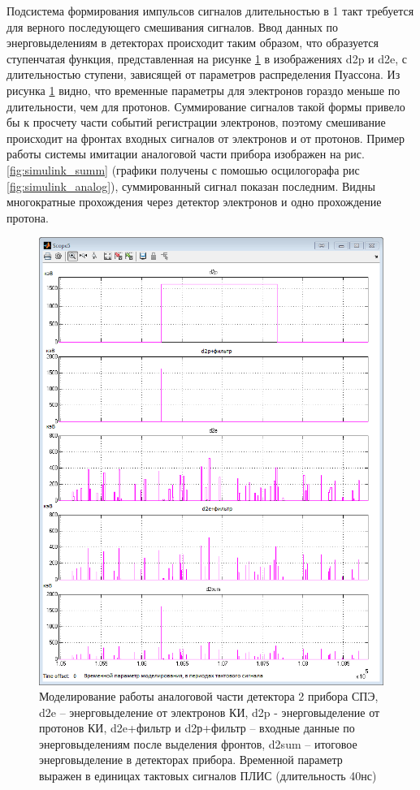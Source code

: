 Подсистема формирования импульсов сигналов длительностью в 1 такт требуется для верного последующего смешивания сигналов. Ввод данных по энерговыделениям в детекторах происходит таким образом, что образуется ступенчатая функция, представленная на рисунке \ref{fig:simulink_analog_scope} в изображениях d2p и d2e, с длительностью ступени, зависящей от параметров распределения Пуассона. Из рисунка \ref{fig:simulink_analog_scope} видно, что временные параметры для электронов гораздо меньше по длительности, чем для протонов. Суммирование сигналов такой формы привело бы к просчету части событий регистрации электронов, поэтому смешивание происходит на фронтах входных сигналов от электронов и от протонов.
Пример работы системы имитации аналоговой части прибора изображен на рис. \ref{fig:simulink_summ} (графики получены с помошью осцилогорафа рис \ref{fig:simulink_analog}), суммированный сигнал показан последним. Видны многократные прохождения через детектор электронов и одно прохождение протона. 
\begin{figure}
\centering
\includegraphics[width=0.7\linewidth]{images/simulink_analog_scope}
\caption[Моделирование работы аналоговой части прибора СПЭ]{Моделирование работы аналоговой части детектора 2 прибора СПЭ, d2e – энерговыделение от электронов КИ, d2p - энерговыделение от протонов КИ, d2e+фильтр и d2р+фильтр – входные данные по энерговыделениям после выделения фронтов,  d2sum – итоговое энерговыделение в детекторах прибора. Временной параметр выражен в единицах тактовых сигналов ПЛИС (длительность 40нс)}
\label{fig:simulink_analog_scope}
\end{figure}
